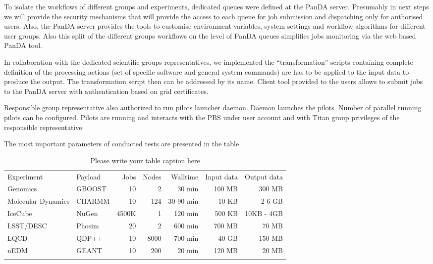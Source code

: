 To isolate the workflows of different groups and experiments, dedicated queues
were defined at the PanDA server. Presumably in  next steps we will provide the
security mechanisms that will provide the access to each queue for job
submission and dispatching only for authorised users. Also, the PanDA server
provides the tools to customise environment variables, system settings and
workflow algorithms for different user groups. Also this split of the different
groups workflows on the level of PanDA queues simplifies jobs monitoring via
the web based PanDA tool. 

In collaboration with the dedicated scientific groups representatives, we
implemented the ``transformation'' scripts containing complete definition of
the processing actions (set of specific software and general system commands)
are has to be applied to the input data to produce the output. The
transformation script then can be addressed by its name. Client tool provided
to the users allows to submit jobs to the PanDA server with authentication
based on grid certificates. 

Responsible group representative also authorized to run pilots launcher daemon.
Daemon launches the pilots. Number of parallel running pilots can be
configured. Pilots are running and interacts with the PBS under user account
and with Titan group privileges of the responsible representative.

The most important parameters of conducted tests are presented in the table

\begin{table}
\caption{Please write your table caption here}
\label{tab:1}       %
\begin{tabular}{llrrrrr}
\hline\noalign{\smallskip}
Experiment & Payload & Jobs & Nodes & Walltime & Input data & Output data \\
\noalign{\smallskip}\hline\noalign{\smallskip}
Genomics           & GBOOST & 10    & 2    & 30 min    & 100 MB & 300 MB \\
Molecular Dynamics & CHARMM & 10    & 124  & 30-90 min & 10 KB  & 2-6 GB \\
IceCube            & NuGen  & 4500K & 1    & 120 min   & 500 KB & 10KB - 4GB \\
LSST/DESC          & Phosim & 20    & 2    & 600 min   & 700 MB & 70 MB \\
LQCD               & QDP++  & 10    & 8000 & 700 min   & 40 GB  & 150 MB \\
nEDM               & GEANT  & 10    & 200  & 20 min    & 120 MB & 20 MB \\
\noalign{\smallskip}\hline
\end{tabular}
\end{table}


